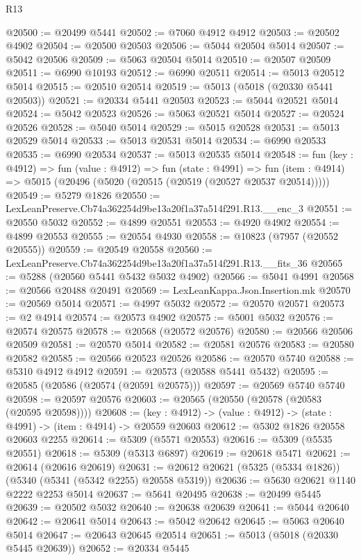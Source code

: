 \begin{lexlean}{R13}
\begin{coremodule}
@20500 := @20499 @5441
@20502 := @7060 @4912 @4912
@20503 := @20502 @4902
@20504 := @20500 @20503
@20506 := @5044 @20504 @5014
@20507 := @5042 @20506
@20509 := @5063 @20504 @5014
@20510 := @20507 @20509
@20511 := @6990 @10193
@20512 := @6990 @20511
@20514 := @5013 @20512 @5014
@20515 := @20510 @20514
@20519 := @5013 (@5018 (@20330 @5441 @20503))
@20521 := @20334 @5441 @20503
@20523 := @5044 @20521 @5014
@20524 := @5042 @20523
@20526 := @5063 @20521 @5014
@20527 := @20524 @20526
@20528 := @5040 @5014
@20529 := @5015 @20528
@20531 := @5013 @20529 @5014
@20533 := @5013 @20531 @5014
@20534 := @6990 @20533
@20535 := @6990 @20534
@20537 := @5013 @20535 @5014
@20548 := fun (key : @4912) =>
  fun (value : @4912) =>
  fun (state : @4991) =>
  fun (item : @4914) => @5015 (@20496 (@5020 (@20515 (@20519 (@20527 @20537 @20514)))))
@20549 := @5279 @1826
@20550 := LexLeanPreserve.Cb74a362254d9be13a20f1a37a514f291.R13.__enc_3
@20551 := @20550 @5032
@20552 := @4899 @20551
@20553 := @4920 @4902
@20554 := @4899 @20553
@20555 := @20554 @4930
@20558 := @10823 (@7957 (@20552 @20555))
@20559 := @20549 @20558
@20560 := LexLeanPreserve.Cb74a362254d9be13a20f1a37a514f291.R13.__fits_36
@20565 := @5288 (@20560 @5441 @5432 @5032 @4902)
@20566 := @5041 @4991
@20568 := @20566 @20488 @20491
@20569 := LexLeanKappa.Json.Insertion.mk
@20570 := @20569 @5014
@20571 := @4997 @5032
@20572 := @20570 @20571
@20573 := @2 @4914
@20574 := @20573 @4902
@20575 := @5001 @5032
@20576 := @20574 @20575
@20578 := @20568 (@20572 @20576)
@20580 := @20566 @20506 @20509
@20581 := @20570 @5014
@20582 := @20581 @20576
@20583 := @20580 @20582
@20585 := @20566 @20523 @20526
@20586 := @20570 @5740
@20588 := @5310 @4912 @4912
@20591 := @20573 (@20588 @5441 @5432)
@20595 := @20585 (@20586 (@20574 (@20591 @20575)))
@20597 := @20569 @5740 @5740
@20598 := @20597 @20576
@20603 := @20565 (@20550 (@20578 (@20583 (@20595 @20598))))
@20608 := (key : @4912) -> (value : @4912) -> (state : @4991) -> (item : @4914) -> @20559 @20603
@20612 := @5302 @1826 @20558 @20603 @2255
@20614 := @5309 (@5571 @20553)
@20616 := @5309 (@5535 @20551)
@20618 := @5309 (@5313 @6897)
@20619 := @20618 @5471
@20621 := @20614 (@20616 @20619)
@20631 := @20612 @20621 (@5325 (@5334 @1826)) (@5340 (@5341 (@5342 @2255) @20558 @5319))
@20636 := @5630 @20621 @1140 @2222 @2253 @5014
@20637 := @5641 @20495
@20638 := @20499 @5445
@20639 := @20502 @5032
@20640 := @20638 @20639
@20641 := @5044 @20640
@20642 := @20641 @5014
@20643 := @5042 @20642
@20645 := @5063 @20640 @5014
@20647 := @20643 @20645 @20514
@20651 := @5013 (@5018 (@20330 @5445 @20639))
@20652 := @20334 @5445

\end{coremodule}
\end{lexlean}
